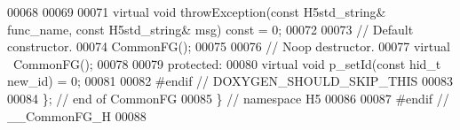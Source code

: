 \begin{DoxyCode}
00068 
00069 
00071         \textcolor{keyword}{virtual} \textcolor{keywordtype}{void} throwException(\textcolor{keyword}{const} H5std\_string& func\_name, \textcolor{keyword}{const} H5std\_string& msg) \textcolor{keyword}{const} = 0;
00072 
00073         \textcolor{comment}{// Default constructor.}
00074         CommonFG();
00075 
00076         \textcolor{comment}{// Noop destructor.}
00077         \textcolor{keyword}{virtual} ~CommonFG();
00078 
00079     \textcolor{keyword}{protected}:
00080         \textcolor{keyword}{virtual} \textcolor{keywordtype}{void} p\_setId(\textcolor{keyword}{const} hid\_t new\_id) = 0;
00081 
00082 \textcolor{preprocessor}{#endif // DOXYGEN\_SHOULD\_SKIP\_THIS}
00083 
00084 \}; \textcolor{comment}{// end of CommonFG}
00085 \} \textcolor{comment}{// namespace H5}
00086 
00087 \textcolor{preprocessor}{#endif // \_\_CommonFG\_H}
00088 
\end{DoxyCode}
